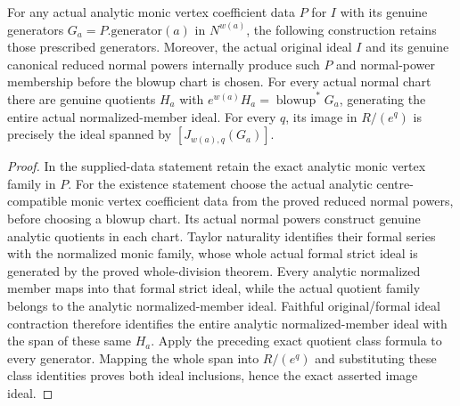 \begin{theorem}
\label{hir:actual-weighted-generator-whole-jet-ideals}
\leanok
For any actual analytic monic vertex coefficient data $P$ for $I$ with its genuine generators $G_a=P.\mathrm{generator}(a)$ in $N^{w(a)}$, the following construction retains those prescribed generators. Moreover, the actual original ideal $I$ and its genuine canonical reduced normal powers internally produce such $P$ and normal-power membership before the blowup chart is chosen.
For every actual normal chart there are genuine quotients $H_a$ with $e^{w(a)}H_a=\operatorname{blowup}^*G_a$, generating the entire actual normalized-member ideal.
For every $q$, its image in $R/(e^q)$ is precisely the ideal spanned by $[J_{w(a),q}(G_a)]$.
\end{theorem}
\begin{proof}
In the supplied-data statement retain the exact analytic monic vertex family in $P$. For the existence statement choose the actual analytic centre-compatible monic vertex coefficient data from the proved reduced normal powers, before choosing a blowup chart.
Its actual normal powers construct genuine analytic quotients in each chart.
Taylor naturality identifies their formal series with the normalized monic family, whose whole actual formal strict ideal is generated by the proved whole-division theorem.
Every analytic normalized member maps into that formal strict ideal, while the actual quotient family belongs to the analytic normalized-member ideal.
Faithful original/formal ideal contraction therefore identifies the entire analytic normalized-member ideal with the span of these same $H_a$.
Apply the preceding exact quotient class formula to every generator.
Mapping the whole span into $R/(e^q)$ and substituting these class identities proves both ideal inclusions, hence the exact asserted image ideal.
\end{proof}

